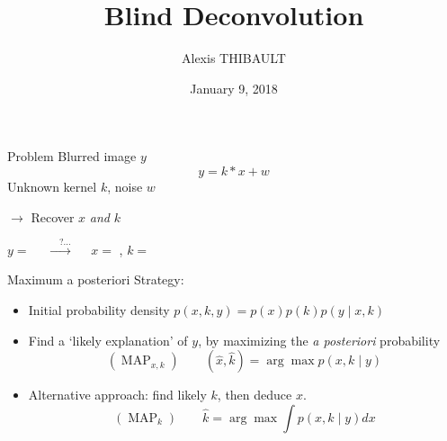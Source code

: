 \documentclass{beamer}
\title{Blind Deconvolution}
\date{January 9, 2018}
\author{Alexis THIBAULT}
\DeclareMathOperator{\MAP}{MAP}
\begin{document}
	
\begin{frame}{}
\maketitle
\end{frame}

\begin{frame}{Problem}
	Blurred image $y$
	\[
	y = k*x + w
	\]
	Unknown kernel $k$, noise $w$
	
	{$\rightarrow$ Recover $x$ \emph{and} $k$}
	
	\begin{center}
	$y=$ 
	\uncover<3->
	{$\quad \xrightarrow{\quad ? \ldots} \quad$%
	$x=$ 
	, $k=$ 
	}
	\end{center}
	
\end{frame}

\begin{frame}{Maximum a posteriori}
Strategy:
\begin{itemize}
	\item Initial probability density $p(x,k,y) = p(x)p(k)p(y\mid x,k)$
	\pause
	\item Find a `likely explanation' of $y$, by maximizing the \emph{a posteriori} probability
	\[
	(\MAP_{x,k}) \quad \quad (\hat{x},\hat{k}) = \arg \max p(x,k \mid y)
	\]
	\pause
	\item Alternative approach: find likely $k$, then deduce $x$.
	\[
	(\MAP_{k}) \quad \quad \hat{k} = \arg \max \int p(x,k \mid y) dx
	\]
\end{itemize}
\end{frame}
	
\end{document}

